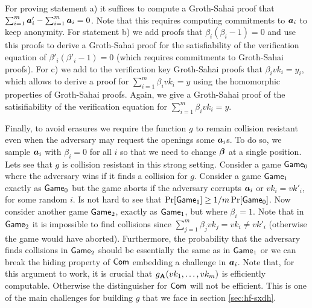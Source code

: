For proving statement a) it suffices to compute a Groth-Sahai proof that $\sum_{i=1}^m {\boldsymbol{a}}'_i - \sum_{i=1}^m{\boldsymbol{a}}_i = 0$. Note that this requires computing commitments to ${\boldsymbol{a}}_i$ to keep anonymity. For  statement b) we add proofs that $\beta_i(\beta_i-1)=0$ and use this proofs to derive a Groth-Sahai proof for the satisfiability of the verification equation of $\beta'_i(\beta'_i-1)=0$ (which requires commitments to Groth-Sahai proofs). For c) we add to the verification key Groth-Sahai proofs that $\beta_i vk_i = y_i$, which allows to derive a proof for $\sum_{i=1}^m \beta_i vk_i = y$ using the homomorphic properties of Groth-Sahai proofs. Again, we give a Groth-Sahai proof of the satisifiability of the verification equation for $\sum_{i=1}^m \beta_i vk_i = y$.

Finally, to avoid erasures we require the function $g$  to remain collision resistant even when the adversary may request the openings some ${\boldsymbol{a}}_i$s. To do so, we sample ${\boldsymbol{a}}_i$ with $\beta_i=0$ for all $i$ so that we need to change ${\boldsymbol{\beta}}$ at a single position. Lets see that $g$ is collision resistant in this strong setting.
Consider a game $\mathsf{Game}_0$ where the adversary wins if it finds a collision for $g$. Consider a game $\mathsf{Game}_1$ exactly as $\mathsf{Game}_0$ but the game aborts if the adversary corrupts ${\boldsymbol{a}}_i$ or $vk_i = vk'_i$, for some random $i$. Is not hard to see that $\Pr[\mathsf{Game}_1]\geq 1/m\Pr[\mathsf{Game}_0]$. Now consider another game $\mathsf{Game}_2$, exactly as $\mathsf{Game}_1$, but where $\beta_i=1$. Note that in $\mathsf{Game}_2$ it is impossible to find collisions since $\sum_{j=1}^m\beta_jvk_j = vk_i\neq vk'_i$ (otherwise the game would have aborted). Furthermore, the probability that the adversary finds collisions in $\mathsf{Game}_2$ should be essentially the same as in $\mathsf{Game}_1$ or we can break the hiding property of $\mathsf{Com}$ embedding a challenge in ${\boldsymbol{a}}_i$. Note that, for this argument to work, it is crucial that $g_{\mathbf{{A}}}(vk_1,\ldots,vk_m)$ is efficiently computable. Otherwise the distinguisher for $\mathsf{Com}$ will not be efficient. This is one of the main challenges for building $g$ that we face in section \ref{sec:hf-sxdh}. 



